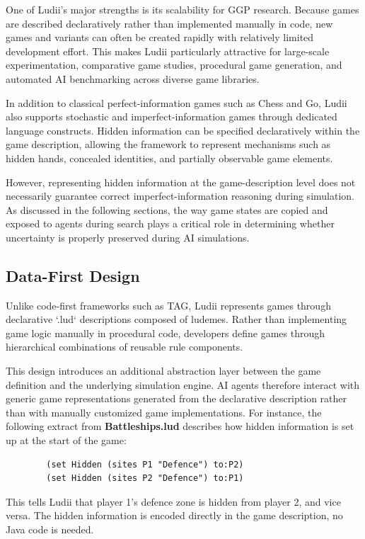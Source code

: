 One of Ludii’s major strengths is its scalability for GGP research. Because games are described declaratively rather than implemented manually in code, new games and variants can often be created rapidly with relatively limited development effort. This makes Ludii particularly attractive for large-scale experimentation, comparative game studies\cite{rautureau2026gametable_opening}, procedural game generation\cite{todd2024gavel}, and automated AI benchmarking across diverse game libraries\cite{piette2019ludii_rbg}.

In addition to classical perfect-information games such as Chess and Go, Ludii also supports stochastic and imperfect-information games through dedicated language constructs. Hidden information can be specified declaratively within the game description, allowing the framework to represent mechanisms such as hidden hands, concealed identities, and partially observable game elements.

However, representing hidden information at the game-description level does not necessarily guarantee correct imperfect-information reasoning during simulation. As discussed in the following sections, the way game states are copied and exposed to agents during search plays a critical role in determining whether uncertainty is properly preserved during AI simulations.

\subsection{Data-First Design}
Unlike code-first frameworks such as TAG, Ludii represents games through declarative `.lud` descriptions composed of ludemes. Rather than implementing game logic manually in procedural code, developers define games through hierarchical combinations of reusable rule components.

This design introduces an additional abstraction layer between the game definition and the underlying simulation engine. AI agents therefore interact with generic game representations generated from the declarative description rather than with manually customized game implementations.
For instance, the following extract from \textbf{Battleships.lud} describes how hidden information is set up at the start of the game:
\begin{center}
    \begin{verbatim}
        (set Hidden (sites P1 "Defence") to:P2)
        (set Hidden (sites P2 "Defence") to:P1)
    \end{verbatim}
\end{center}
This tells Ludii that player 1's defence zone is hidden from player 2, and vice versa. The hidden information is encoded directly in the game description, no Java code is needed.

